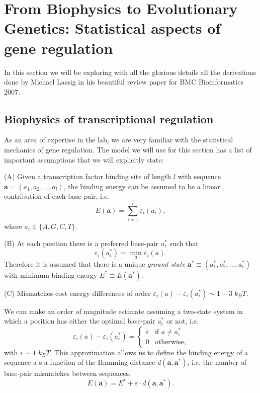 \section{From Biophysics to Evolutionary Genetics: Statistical aspects of gene
regulation}

In this section we will be exploring with all the glorious details all the
derivations done by Michael Lassig in his beautiful review paper for BMC
Bioinformatics 2007.

\subsection{Biophysics of transcriptional regulation}
As an area of expertise in the lab, we are very familiar with the statistical
mechanics of gene regulation. The model we will use for this section has a list
of important assumptions that we will explicitly state:

(A) Given a transcription factor binding site of length $l$ with sequence
$\mathbf{a} = (a_1, a_2, \ldots, a_l)$, the binding energy can be assumed to be
a linear contribution of each base-pair, i.e.
\begin{equation}
  E(\mathbf{a}) = \sum_{i=1}^l \varepsilon_i (a_i),
\end{equation}
where $a_i \in \{A, G, C, T \}$.

(B) At each position there is a preferred base-pair $a_i^*$ such that
\begin{equation}
  \varepsilon_i (a_i^*) = \min_a \varepsilon_i(a).
\end{equation}
Therefore it is assumed that there is a unique {\it ground state} $\mathbf{a}^*
\equiv (a_1^*, a_2^*, \ldots, a_l^*)$ with minimum binding energy $E^* \equiv
E(\mathbf{a}^*)$.

(C) Mismatches cost energy differences of order $\varepsilon_i (a) -
\varepsilon_i (a_i^*) \sim 1-3 \; k_BT$.

We can make an order of magnitude estimate assuming a two-state system in which
a position has either the optimal base-pair $a_i^*$ or not, i.e.
\begin{equation}
\varepsilon_i (a) - \varepsilon_i (a_i^*) =
\begin{cases}
  \varepsilon & \text{if } a \neq a_i^*\\
  0 & \text{otherwise},
\end{cases}
\end{equation}
with $\varepsilon \sim 1 \; k_BT$. This approximation allows us to define the
binding energy of a sequence a s a function of the Hamming distance
$d(\mathbf{a}, \mathbf{a^*})$, i.e. the number of base-pair mismatches between
sequences,
\begin{equation}
  E(\mathbf{a}) = E^* + \varepsilon \cdot d(\mathbf{a}, \mathbf{a^*}).
\end{equation}

